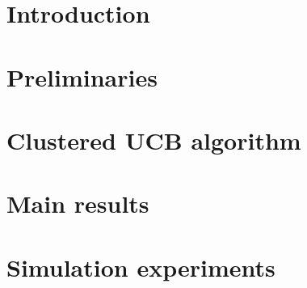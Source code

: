 \documentclass[11pt,letterpaper,english]{article}
\begin{document}
\section{Introduction}
\label{sec:intro}





\section{Preliminaries}
\label{sec:prelims}

	


\section{Clustered UCB algorithm}
\label{sec:clusucb}


\section{Main results}
\label{sec:results}



\section{Simulation experiments}
\label{sec:expts}

\end{document}
